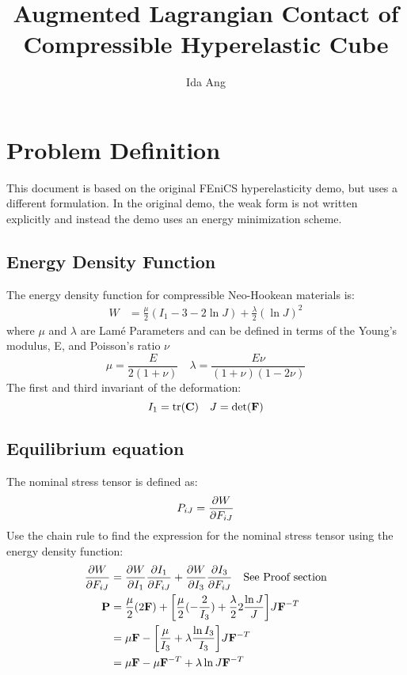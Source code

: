 \documentclass[12pt,3p]{article}
\begin{document}
\title{Augmented Lagrangian Contact of Compressible Hyperelastic Cube \\
	\large{} }
\author{Ida Ang}
\date{\vspace{-5ex}}
\maketitle

\section{Problem Definition}
This document is based on the original FEniCS hyperelasticity demo, but uses a different formulation. In the original demo, the weak form is not written explicitly and instead the demo uses an energy minimization scheme. 

\subsection{Energy Density Function}
The energy density function for compressible Neo-Hookean materials is: 
\begin{align}\label{EDComp}
W &= \frac{\mu}{2} (I_1 - 3 - 2 \ln J) + \frac{\lambda}{2} (\ln J)^2 
\end{align}
where $\mu$ and $\lambda$ are Lamé Parameters and can be defined in terms of the Young's modulus, E, and Poisson's ratio $\nu$
\begin{equation}\label{lame}
\mu = \frac{E}{2 (1 + \nu)} \quad \lambda = \frac{E \nu}{(1+ \nu) (1 - 2 \nu)} 
\end{equation}
The first and third invariant of the deformation:
\begin{equation}\label{invariants}
I_1 = \trace(\mathbf{C}) \quad J = \det(\mathbf{F})  
\end{equation}

\subsection{Equilibrium equation}
The nominal stress tensor is defined as: 
\begin{equation}\label{PW}
P_{iJ} = \pdv{W}{F_{iJ}}
\end{equation}
Use the chain rule to find the expression for the nominal stress tensor using the energy density function: 
\begin{align*} 
\pdv{W}{F_{iJ}} &= \pdv{W}{I_1} \pdv{I_1}{F_{iJ}} + \pdv{W}{I_3} \pdv{I_3}{F_{iJ}} \quad \text{See Proof section} \\
\mathbf{P} &= \frac{\mu}{2} (2 \mathbf{F}) + \bigg[ \frac{\mu}{2} (-\frac{2}{I_3}) + \frac{\lambda}{2} 2 \frac{ \ln J}{J} \bigg] J \mathbf{F}^{-T} \\
		&= \mu \mathbf{F} - \bigg[ \frac{\mu}{I_3} + \lambda \frac{\ln I_3}{I_3} \bigg] J \mathbf{F}^{-T} \\
		&= \mu \mathbf{F} - \mu \mathbf{F}^{-T} + \lambda \ln J  \mathbf{F}^{-T} 
\end{align*}
\end{document}
